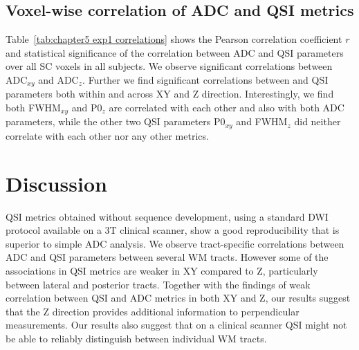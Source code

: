 \subsection{Voxel-wise correlation of ADC and QSI metrics}
Table~\ref{tab:chapter5 exp1 correlations} shows the Pearson correlation coefficient $\mathit{r}$ and statistical significance of the correlation between ADC and \gls{QSI} parameters over all \gls{SC} voxels in all subjects. We observe significant correlations between \gls{ADC}$_{xy}$ and \gls{ADC}$_z$. Further we find significant correlations between
and \gls{QSI} parameters both within and across XY and Z direction. Interestingly, we find both FWHM$_{xy}$ and P0$_z$ are correlated with each other and also with both ADC parameters, while the other two \gls{QSI} parameters P0$_{xy}$ and FWHM$_z$ did neither correlate with each other nor any other metrics.%
\section{Discussion} \gls{QSI} metrics obtained without sequence development, using a standard {\gls{DWI}} protocol available on a 3T clinical scanner, show a good reproducibility that is superior to simple \gls{ADC} analysis. We observe tract-specific correlations between \gls{ADC} and \gls{QSI} parameters between several WM tracts. However some of the associations in \gls{QSI} metrics are weaker in XY compared to Z, particularly between lateral and posterior tracts. Together with the findings of weak correlation between \gls{QSI} and ADC metrics in both XY and Z, our results suggest that the Z direction provides additional information to perpendicular measurements. Our results also suggest that on a clinical scanner \gls{QSI} might not be able to reliably distinguish between individual \gls{WM} tracts.

